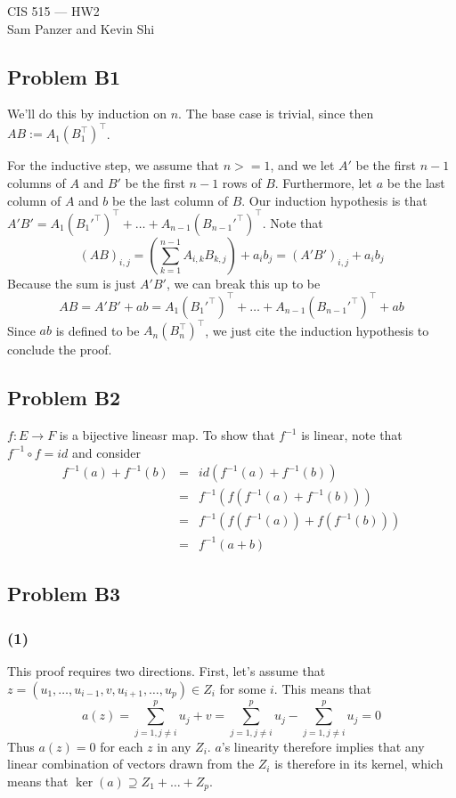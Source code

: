 \documentclass{article}
\begin{document}
\begin{center}CIS 515 --- HW2\\Sam Panzer and Kevin Shi\end{center}
\subsection{Problem B1}
We'll do this by induction on $n$.
The base case is trivial, since then $AB := A_1(B_1^\top)^\top$.

For the inductive step, we assume that $n >= 1$, and we let $A'$ be the first
$n - 1$ columns of $A$ and $B'$ be the first $n - 1$ rows of $B$. Furthermore,
let $a$ be the last column of $A$ and $b$ be the last column of $B$.
Our induction hypothesis is that
$A'B' = A_1(B_1'^\top)^\top + \dots + A_{n-1}(B_{n-1}'^\top)^\top $.
Note that
\[(AB)_{i,j} = \left( \sum_{k=1}^{n-1} A_{i,k}B_{k,j} \right) + a_ib_j
             = (A'B')_{i,j} + a_ib_j\]
Because the sum is just $A'B'$, we can break this up to be
\[AB = A'B' + ab = A_1(B_1'^\top)^\top + \dots + A_{n-1}(B_{n-1}'^\top)^\top  +
ab\]
Since $ab$ is defined to be $A_n(B_n^\top)^\top$, we just cite the induction
hypothesis to conclude the proof.

\subsection{Problem B2}
$f: E \rightarrow F$ is a bijective lineasr map. To show that $f^{-1}$ is
linear, note that $f^{-1} \circ f = id$ and consider
\begin{eqnarray*}
f^{-1}(a) + f^{-1}(b) &=& id(f^{-1}(a) + f^{-1}(b) )\\
&=& f^{-1}(f(f^{-1}(a) + f^{-1}(b))) \\
&=&f^{-1}(f(f^{-1}(a)) + f(f^{-1}(b)))\\
&=& f^{-1}(a + b)
\end{eqnarray*}
\subsection{Problem B3}
\subsubsection{(1)}
This proof requires two directions.
First, let's assume that $z = (u_1,\dots,u_{i-1},v,u_{i+1}, \dots, u_p) \in Z_i$
for some $i$.
This means that 
\[a(z) = \sum_{j = 1, j \neq i}^p u_j + v 
      = \sum_{j = 1, j \neq i}^p u_j - \sum_{j = 1, j \neq i}^p u_j = 0\]
Thus $a(z) = 0$ for each $z$ in any $Z_i$. $a$'s linearity therefore implies
that any linear combination of vectors drawn from the $Z_i$ is therefore in its
kernel, which means that $\ker(a) \supseteq Z_1 + \dots + Z_p$.
\end{document}
